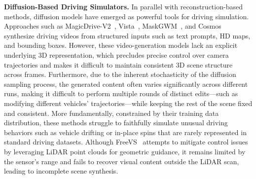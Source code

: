 \documentclass[runningheads]{llncs}
\begin{document}
\noindent \textbf{Diffusion-Based Driving Simulators.}
In parallel with reconstruction-based methods, diffusion models have emerged as powerful tools for driving simulation. Approaches such as MagicDrive-V2~\cite{gao2025magicdrive-v2}, Vista~\cite{gao2024vista}, MaskGWM~\cite{ni2025maskgwm}, and Cosmos~\cite{nvidia2026worldsimulationvideofoundation} synthesize driving videos from structured inputs such as text prompts, HD maps, and bounding boxes. However, these video-generation models lack an explicit underlying 3D representation, which precludes precise control over camera trajectories and makes it difficult to maintain consistent 3D scene structure across frames. Furthermore, due to the inherent stochasticity of the diffusion sampling process, the generated content often varies significantly across different runs, making it difficult to perform multiple rounds of distinct edits—such as modifying different vehicles' trajectories—while keeping the rest of the scene fixed and consistent. More fundamentally, constrained by their training data distribution, these methods struggle to faithfully simulate unusual driving behaviors such as vehicle drifting or in-place spins that are rarely represented in standard driving datasets. Although FreeVS~\cite{wang2024freevs} attempts to mitigate control issues by leveraging LiDAR point clouds for geometric guidance, it remains limited by the sensor's range and fails to recover visual content outside the LiDAR scan, leading to incomplete scene synthesis.

\end{document}
